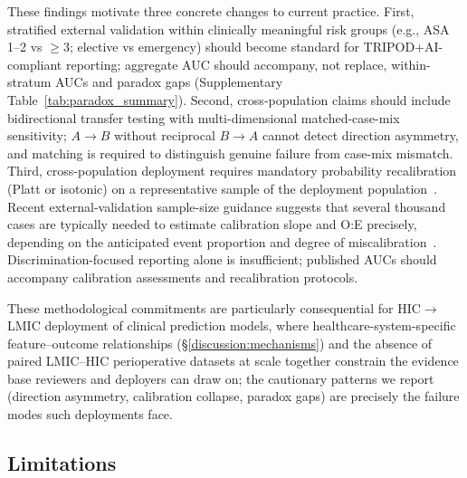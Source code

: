 These findings motivate three concrete changes to current practice. First, stratified external validation within clinically meaningful risk groups (e.g., ASA 1--2 vs $\geq 3$; elective vs emergency) should become standard for TRIPOD+AI-compliant reporting; aggregate AUC should accompany, not replace, within-stratum AUCs and paradox gaps (Supplementary Table~\ref{tab:paradox_summary}). Second, cross-population claims should include bidirectional transfer testing with multi-dimensional matched-case-mix sensitivity; $A \to B$ without reciprocal $B \to A$ cannot detect direction asymmetry, and matching is required to distinguish genuine failure from case-mix mismatch. Third, cross-population deployment requires mandatory probability recalibration (Platt or isotonic) on a representative sample of the deployment population~\cite{eylerdang2021right}. Recent external-validation sample-size guidance suggests that several thousand cases are typically needed to estimate calibration slope and O:E precisely, depending on the anticipated event proportion and degree of miscalibration~\cite{Riley2021Ext}. Discrimination-focused reporting alone is insufficient; published AUCs should accompany calibration assessments and recalibration protocols.

These methodological commitments are particularly consequential for HIC$\to$LMIC deployment of clinical prediction models, where healthcare-system-specific feature--outcome relationships (\S\ref{discussion:mechanisms}) and the absence of paired LMIC--HIC perioperative datasets at scale together constrain the evidence base reviewers and deployers can draw on; the cautionary patterns we report (direction asymmetry, calibration collapse, paradox gaps) are precisely the failure modes such deployments face.

\subsection{Limitations}
\label{discussion:limitations}


